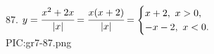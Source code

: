 87. $y=\cfrac{x^2+2x}{|x|}=\cfrac{x(x+2)}{|x|}=\begin{cases} x+2,\ x>0,\\ -x-2,\ x<0.\end{cases}$\\
{{PIC:gr7-87.png}}\newpage\noindent
